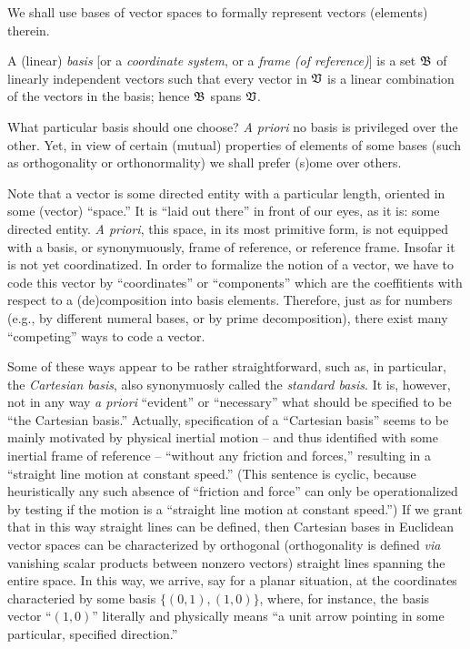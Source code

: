 We shall use bases of vector spaces to formally represent vectors (elements) therein.

A (linear) {\em basis}
[or a {\em coordinate system}, or a {\em frame (of reference)}]
is a set    $\frak B$
of linearly independent vectors
such that every vector
in $\frak V$ is a linear combination of the vectors in the basis; hence
$\frak B$ spans $\frak V$.

What particular basis should one choose?
{\em A priori} no basis is privileged over the other.
Yet, in view of certain (mutual) properties of elements of some bases (such as orthogonality or orthonormality)
we shall prefer (s)ome over others.


Note that a vector is some directed entity with a particular length,
oriented in some (vector) ``space.''
It is ``laid out there'' in front of our eyes, as it is: some directed entity.
{\it A priori}, this space, in its most primitive form,
is not equipped with a basis, or synonymuously, frame of reference, or reference frame.
Insofar it is not yet coordinatized.
In order to formalize the notion of a vector, we have to code this vector by ``coordinates''
or ``components'' which are the coeffitients with respect to a (de)composition into basis elements.
Therefore, just as for numbers (e.g., by different numeral bases, or by prime decomposition),
there exist many ``competing'' ways to code a vector.

Some of these ways appear to be rather straightforward,
such as, in particular, the {\em Cartesian basis},
also synonymuosly called the  {\em standard basis}.
It is, however, not in any way {\it a priori}
``evident'' or ``necessary'' what should be specified to be ``the Cartesian basis.''
Actually, specification of a ``Cartesian basis'' seems to be mainly motivated by
physical inertial motion --
and thus identified with some inertial frame of reference --
``without any friction and
forces,'' resulting in a ``straight line motion at constant speed.''
(This sentence is  cyclic, because heuristically any such absence of ``friction and
force''  can only be operationalized by testing if the motion is a
``straight line motion at constant speed.'')
If we grant that in this way straight lines can be defined, then
Cartesian bases in Euclidean vector spaces can be characterized by
orthogonal (orthogonality is defined {\it via} vanishing scalar products between nonzero vectors)
straight lines spanning the entire space.
In this way, we arrive, say for a planar situation, at the coordinates
characteried by some basis $\{(0,1),(1,0)\}$,
where, for instance, the basis vector ``$(1,0)$'' literally and physically
means ``a unit arrow pointing in some particular, specified direction.''

